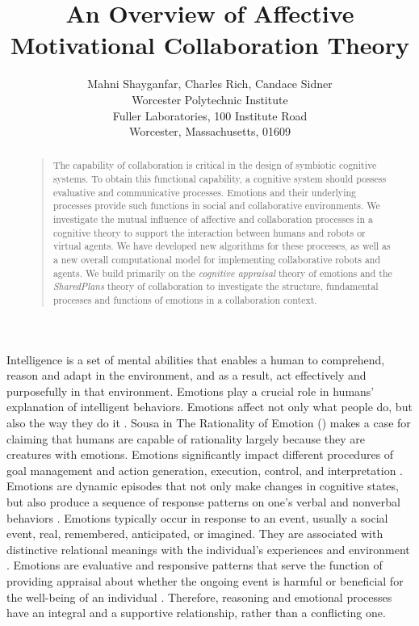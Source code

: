 \documentclass[letterpaper]{article}
\begin{document}
%
\title{An Overview of Affective Motivational Collaboration Theory}
\author{Mahni Shayganfar, Charles Rich, Candace Sidner\\
Worcester Polytechnic Institute\\
Fuller Laboratories, 100 Institute Road\\
Worcester, Massachusetts, 01609\\
}
\maketitle
\begin{abstract}
\begin{quote}
The capability of collaboration is critical in the design of symbiotic cognitive
systems. To obtain this functional capability, a cognitive system should possess
evaluative and communicative processes. Emotions and their underlying processes
provide such functions in social and collaborative environments. We investigate
the mutual influence of affective and collaboration processes in a cognitive
theory to support the interaction between humans and robots or virtual agents.
We have developed new algorithms for these processes, as well as a new overall
computational model for implementing collaborative robots and agents. We build
primarily on the \textit{cognitive appraisal} theory of emotions and the
\textit{SharedPlans} theory of collaboration to investigate the structure,
fundamental processes and functions of emotions in a collaboration context.
\end{quote}
\end{abstract}

Intelligence is a set of mental abilities that enables a human to comprehend,
reason and adapt in the environment, and as a result, act effectively and
purposefully in that environment. Emotions play a crucial role in humans'
explanation of intelligent behaviors. Emotions affect not only what people do,
but also the way they do it \cite{cowie:concepts-definitions}. Sousa in The
Rationality of Emotion (\citeyear{sousa:rationality-emotion}) makes a case for
claiming that humans are capable of rationality largely because they are
creatures with emotions. Emotions significantly impact different procedures of
goal management and action generation, execution, control, and interpretation
\cite{zhu:emotion-action}. Emotions are dynamic episodes that not only make
changes in cognitive states, but also produce a sequence of response patterns on
one's verbal and nonverbal behaviors \cite{scherer:expression-appraisal}.
Emotions typically occur in response to an event, usually a social event, real,
remembered, anticipated, or imagined. They are associated with distinctive
relational meanings with the individual's experiences and environment
\cite{parkinson:holds-emotion}. Emotions are evaluative and responsive patterns
that serve the function of providing appraisal about whether the ongoing event
is harmful or beneficial for the well-being of an individual
\cite{zhu:emotion-action}. Therefore, reasoning and emotional processes have an
integral and a supportive relationship, rather than a conflicting one.
\end{document}
